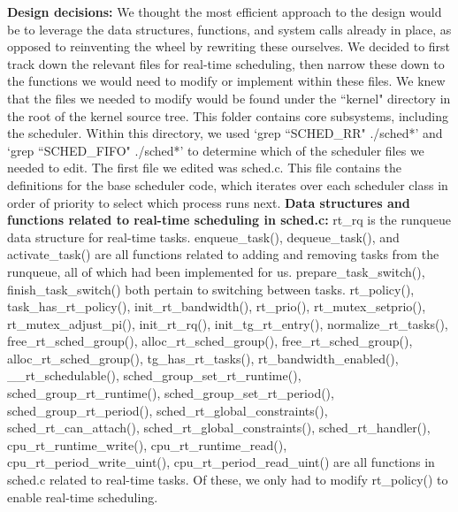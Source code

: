 \documentclass[letterpaper,10pt,titlepage]{article}
\newcommand{\ignore}[2]{\hspace{0in}#2} %
\newcommand{\tab}{\hspace*{2em}} %
\begin{document}
\begin{enumerate}
\tab \textbf{Design decisions:} We thought the most efficient approach to the design would be to leverage the data structures, functions, and system calls already in place, as opposed to reinventing the wheel by rewriting these ourselves. We decided to first track down the relevant files for real-time scheduling, then narrow these down to the functions we would need to modify or implement within these files. We knew that the files we needed to modify would be found under the ``kernel" directory in the root of the kernel source tree. This folder contains core subsystems, including the scheduler. Within this directory, we used `grep ``SCHED\_RR" ./sched*' and `grep ``SCHED\_FIFO" ./sched*' to determine which of the scheduler files we needed to edit. The first file we edited was sched.c. This file contains the definitions for the base scheduler code, which iterates over each scheduler class in order of priority to select which process runs next. \ignore{[Linux Kernel Development, pg. 47]}

\tab \textbf{Data structures and functions related to real-time scheduling in sched.c:} rt\_rq is the runqueue data structure for real-time tasks. enqueue\_task(), dequeue\_task(), and activate\_task() are all functions related to adding and removing tasks from the runqueue, all of which had been implemented for us. prepare\_task\_switch(), finish\_task\_switch() both pertain to switching between tasks. rt\_policy(), task\_has\_rt\_policy(), init\_rt\_bandwidth(), rt\_prio(), 
\newline
rt\_mutex\_setprio(), rt\_mutex\_adjust\_pi(), init\_rt\_rq(), init\_tg\_rt\_entry(), normalize\_rt\_tasks(), free\_rt\_sched\_group(), alloc\_rt\_sched\_group(), free\_rt\_sched\_group(), alloc\_rt\_sched\_group(), tg\_has\_rt\_tasks(), rt\_bandwidth\_enabled(), 
\newline
\_\_rt\_schedulable(), sched\_group\_set\_rt\_runtime(), sched\_group\_rt\_runtime(), sched\_group\_set\_rt\_period(), 
\newline
sched\_group\_rt\_period(), sched\_rt\_global\_constraints(), sched\_rt\_can\_attach(), sched\_rt\_global\_constraints(), 
\newline
sched\_rt\_handler(), cpu\_rt\_runtime\_write(), cpu\_rt\_runtime\_read(), cpu\_rt\_period\_write\_uint(), cpu\_rt\_period\_read\_uint() are all functions in sched.c related to real-time tasks. Of these, we only had to modify rt\_policy() to enable real-time scheduling.


\end{enumerate}
\end{document}
